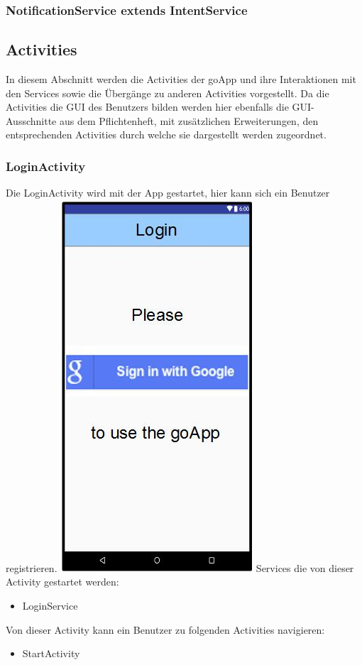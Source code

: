 	\subsubsection {NotificationService extends IntentService}
	
	\subsection{Activities}
	In diesem Abschnitt werden die Activities der goApp und ihre Interaktionen mit den Services sowie die Übergänge zu anderen Activities vorgestellt.
	Da die Activities die GUI des Benutzers bilden werden hier ebenfalls die GUI-Ausschnitte aus dem Pflichtenheft, mit zusätzlichen Erweiterungen, den entsprechenden Activities durch welche sie dargestellt werden zugeordnet.  
	\subsubsection {LoginActivity}
	Die LoginActivity wird mit der App gestartet, hier kann sich ein Benutzer registrieren.
	\newline
	\includegraphics[width=.3\textwidth]{GUI_Login.jpg}
	\newline
	Services die von dieser Activity gestartet werden:
	\begin{itemize}
	\item LoginService
	\end{itemize}
	Von dieser Activity kann ein Benutzer zu folgenden Activities navigieren:
	\begin{itemize} 
	 \item StartActivity
	\end{itemize}
	
